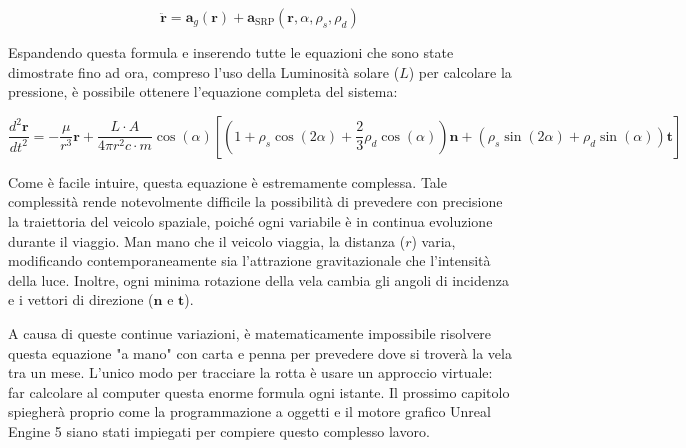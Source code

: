 \begin{equation} \label{eq:equazione_moto_finale}
    \ddot{\mathbf{r}} = \mathbf{a}_g(\mathbf{r}) + \mathbf{a}_{\text{SRP}}(\mathbf{r}, \alpha, \rho_s, \rho_d)
\end{equation}

Espandendo questa formula e inserendo tutte le equazioni che sono state dimostrate fino ad ora, compreso l'uso della Luminosità solare ($L$) per calcolare la pressione, è possibile ottenere l'equazione completa del sistema:

\begin{equation}
    \frac{d^2\mathbf{r}}{dt^2} = - \frac{\mu}{r^3} \mathbf{r} + \frac{L \cdot A}{4 \pi r^2 c \cdot m} \cos(\alpha) \left[ \left(1 + \rho_s \cos(2\alpha) + \frac{2}{3}\rho_d \cos(\alpha) \right)\mathbf{n} + \left(\rho_s \sin(2\alpha) + \rho_d \sin(\alpha) \right)\mathbf{t} \right]
\end{equation}

Come è facile intuire, questa equazione è estremamente complessa. Tale complessità rende notevolmente difficile la possibilità di prevedere con precisione la traiettoria del veicolo spaziale, poiché ogni variabile è in continua evoluzione durante il viaggio. Man mano che il veicolo viaggia, la distanza ($r$) varia, modificando contemporaneamente sia l'attrazione gravitazionale che l'intensità della luce. Inoltre, ogni minima rotazione della vela cambia gli angoli di incidenza e i vettori di direzione ($\mathbf{n}$ e $\mathbf{t}$).

A causa di queste continue variazioni, è matematicamente impossibile risolvere questa equazione "a mano" con carta e penna per prevedere dove si troverà la vela tra un mese. L'unico modo per tracciare la rotta è usare un approccio virtuale: far calcolare al computer questa enorme formula ogni istante. Il prossimo capitolo spiegherà proprio come la programmazione a oggetti e il motore grafico Unreal Engine 5 siano stati impiegati per compiere questo complesso lavoro.

